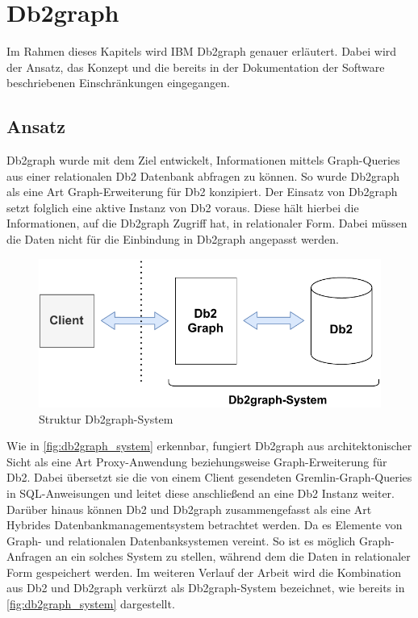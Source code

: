 \chapter{Db2graph}
\label{chap:db2graph}

Im Rahmen dieses Kapitels wird IBM Db2graph genauer erläutert. Dabei wird der Ansatz, das Konzept und die bereits in der Dokumentation der Software beschriebenen Einschränkungen eingegangen. 

\section{Ansatz}
\label{db2graph:ansatz}
Db2graph wurde mit dem Ziel entwickelt, Informationen mittels Graph-Queries aus einer relationalen Db2 Datenbank abfragen zu können. So wurde Db2graph als eine Art Graph-Erweiterung für Db2 konzipiert. Der Einsatz von Db2graph setzt folglich eine aktive Instanz von Db2 voraus. Diese hält hierbei die Informationen, auf die Db2graph Zugriff hat, in relationaler Form. Dabei müssen die Daten nicht für die Einbindung in Db2graph angepasst werden.

\begin{figure}[h]
    \centering
    \includegraphics[width=\textwidth]{images/db2graph_system.pdf}
    \vspace{0.1em}
    \caption{Struktur Db2graph-System}
    \label{fig:db2graph_system}
\end{figure}

Wie in \autoref{fig:db2graph_system} erkennbar, fungiert Db2graph aus architektonischer Sicht als eine Art Proxy-Anwendung beziehungsweise Graph-Erweiterung für Db2. Dabei übersetzt sie die von einem Client gesendeten Gremlin-Graph-Queries in SQL-An\-wei\-sung\-en und leitet diese anschließend an eine Db2 Instanz weiter. Darüber hinaus können Db2 und Db2graph zusammengefasst als eine Art Hybrides Datenbankmanagementsystem betrachtet werden. Da es Elemente von Graph- und relationalen Datenbanksystemen vereint. So ist es möglich Graph-Anfragen an ein solches System zu stellen, während dem die Daten in relationaler Form gespeichert werden. Im weiteren Verlauf der Arbeit wird die Kombination aus Db2 und Db2graph verkürzt als Db2graph-System bezeichnet, wie bereits in \autoref{fig:db2graph_system} dargestellt. 


